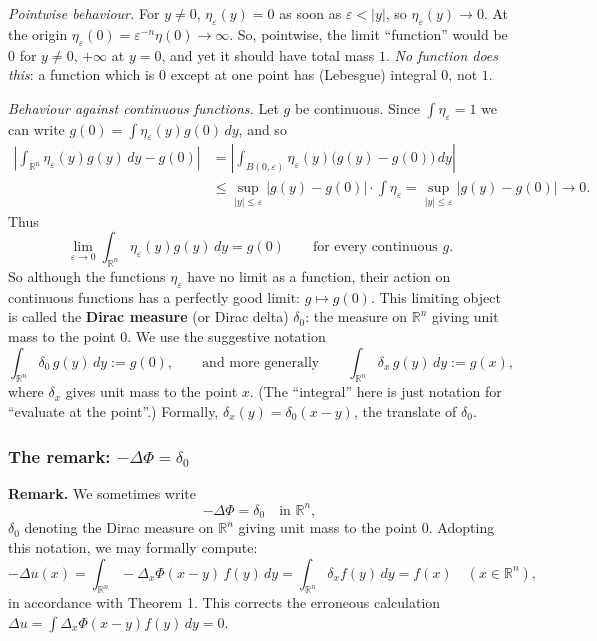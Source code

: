 \documentclass[11pt]{article}
\theoremstyle{plain}
\theoremstyle{definition}
\theoremstyle{remark}
\begin{document}
\emph{Pointwise behaviour.} For $y \neq 0$, $\eta_\varepsilon(y) = 0$ as soon as $\varepsilon < |y|$, so $\eta_\varepsilon(y) \to 0$. At the origin $\eta_\varepsilon(0) = \varepsilon^{-n}\eta(0) \to \infty$. So, pointwise, the limit ``function'' would be $0$ for $y \neq 0$, $+\infty$ at $y = 0$, and yet it should have total mass $1$. \emph{No function does this}: a function which is $0$ except at one point has (Lebesgue) integral $0$, not $1$.

\emph{Behaviour against continuous functions.} Let $g$ be continuous. Since $\int \eta_\varepsilon = 1$ we can write $g(0) = \int \eta_\varepsilon(y) g(0)\, dy$, and so
\begin{align*}
\left| \int_{\mathbb{R}^n} \eta_\varepsilon(y) g(y)\, dy - g(0) \right| &= \left| \int_{B(0,\varepsilon)} \eta_\varepsilon(y)\big(g(y) - g(0)\big)\, dy \right| \\
&\leq \sup_{|y| \leq \varepsilon} |g(y) - g(0)| \cdot \int \eta_\varepsilon = \sup_{|y| \leq \varepsilon} |g(y) - g(0)| \to 0.
\end{align*}
Thus
$$ \lim_{\varepsilon \to 0} \int_{\mathbb{R}^n} \eta_\varepsilon(y) g(y)\, dy = g(0) \qquad \text{for every continuous } g. $$
So although the functions $\eta_\varepsilon$ have no limit as a function, their action on continuous functions has a perfectly good limit: $g \mapsto g(0)$. This limiting object is called the \textbf{Dirac measure} (or Dirac delta) $\delta_0$: the measure on $\mathbb{R}^n$ giving unit mass to the point $0$. We use the suggestive notation
$$ \int_{\mathbb{R}^n} \delta_0\, g(y)\, dy := g(0), \qquad \text{and more generally} \qquad \int_{\mathbb{R}^n} \delta_x\, g(y)\, dy := g(x), $$
where $\delta_x$ gives unit mass to the point $x$. (The ``integral'' here is just notation for ``evaluate at the point''.) Formally, $\delta_x(y) = \delta_0(x - y)$, the translate of $\delta_0$.

\subsubsection{The remark: $-\Delta\Phi = \delta_0$}
\textbf{Remark.} We sometimes write
$$ -\Delta \Phi = \delta_0 \quad \text{in } \mathbb{R}^n, $$
$\delta_0$ denoting the Dirac measure on $\mathbb{R}^n$ giving unit mass to the point $0$. Adopting this notation, we may formally compute:
$$ -\Delta u(x) = \int_{\mathbb{R}^n} -\Delta_x\Phi(x-y)\, f(y)\, dy = \int_{\mathbb{R}^n} \delta_x f(y)\, dy = f(x) \quad (x \in \mathbb{R}^n), $$
in accordance with Theorem 1. This corrects the erroneous calculation $\Delta u = \int \Delta_x\Phi(x-y) f(y)\, dy = 0$.
\end{document}
